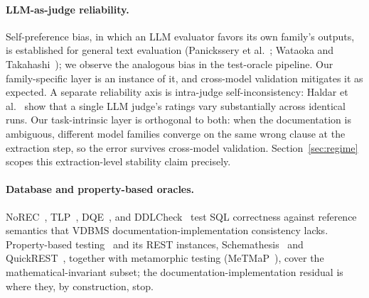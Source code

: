 \documentclass[sigconf]{acmart}
\begin{document}
\paragraph{LLM-as-judge reliability.} Self-preference bias, in which an LLM evaluator favors its own family's outputs, is established for general text evaluation (Panickssery et al.~\cite{panickssery24}; Wataoka and Takahashi~\cite{wataoka24}); we observe the analogous bias in the test-oracle pipeline. Our family-specific layer is an instance of it, and cross-model validation mitigates it as expected. A separate reliability axis is intra-judge self-inconsistency: Haldar et al.~\cite{haldar25} show that a single LLM judge's ratings vary substantially across identical runs. Our task-intrinsic layer is orthogonal to both: when the documentation is ambiguous, different model families converge on the same wrong clause at the extraction step, so the error survives cross-model validation. Section~\ref{sec:regime} scopes this extraction-level stability claim precisely.

\paragraph{Database and property-based oracles.} NoREC~\cite{norec20}, TLP~\cite{tlp20}, DQE~\cite{dqe20}, and DDLCheck~\cite{ddlcheck25} test SQL correctness against reference semantics that VDBMS documentation-implementation consistency lacks. Property-based testing~\cite{claessen00} and its REST instances, Schemathesis~\cite{schemathesis} and QuickREST~\cite{quickrest20}, together with metamorphic testing (MeTMaP~\cite{metmap24}), cover the mathematical-invariant subset; the documentation-implementation residual is where they, by construction, stop.
\end{document}
